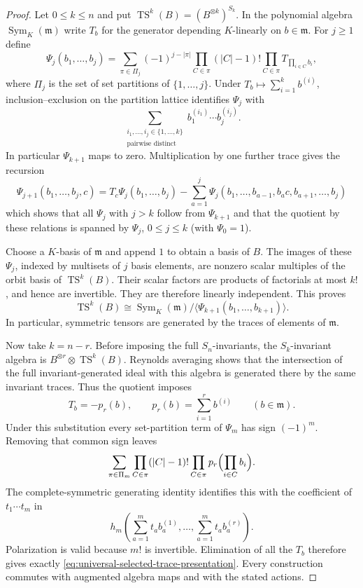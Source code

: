 \begin{proof}
Let $0\le k\le n$ and put $\operatorname{TS}^k(B)
=(B^{\otimes k})^{S_k}$.  In the polynomial algebra
$\operatorname{Sym}_K(\mathfrak m)$ write $T_b$ for the generator
depending $K$-linearly on $b\in\mathfrak m$.  For $j\ge1$ define
\[
 \Psi_j(b_1,\ldots,b_j)=
 \sum_{\pi\in\Pi_j}(-1)^{j-|\pi|}
       \prod_{C\in\pi}(|C|-1)!
       \prod_{C\in\pi}T_{\prod_{i\in C}b_i},
\]
where $\Pi_j$ is the set of set partitions of $\{1,\ldots,j\}$.
Under $T_b\mapsto\sum_{i=1}^k b^{(i)}$, inclusion--exclusion on
the partition lattice identifies $\Psi_j$ with
\[
 \sum_{\substack{i_1,\ldots,i_j\in\{1,\ldots,k\}\\
                  \text{pairwise distinct}}}
      b_1^{(i_1)}\cdots b_j^{(i_j)}.
\]
In particular $\Psi_{k+1}$ maps to zero.  Multiplication by one
further trace gives the recursion
\begin{equation}\label{eq:trace-recursion-universal}
 \Psi_{j+1}(b_1,\ldots,b_j,c)
 =T_c\Psi_j(b_1,\ldots,b_j)
  -\sum_{a=1}^j
      \Psi_j(b_1,\ldots,b_{a-1},b_ac,b_{a+1},\ldots,b_j)
\end{equation}
which shows that all $\Psi_j$ with $j>k$ follow from
$\Psi_{k+1}$ and that the quotient by these relations is spanned
by $\Psi_j$, $0\le j\le k$ (with $\Psi_0=1$).

Choose a $K$-basis of $\mathfrak m$ and append $1$ to obtain a
basis of $B$.  The images of these $\Psi_j$, indexed by multisets
of $j$ basis elements, are nonzero scalar multiples of the orbit
basis of $\operatorname{TS}^k(B)$.  Their scalar factors are
products of factorials at most $k!$, and hence are invertible.
They are therefore linearly independent.  This proves
\[
 \operatorname{TS}^k(B)
 \cong\operatorname{Sym}_K(\mathfrak m)/
       \langle\Psi_{k+1}(b_1,\ldots,b_{k+1})\rangle.
\]
In particular, symmetric tensors are generated by the traces of
elements of $\mathfrak m$.

Now take $k=n-r$.  Before imposing the full $S_n$-invariants, the
$S_k$-invariant algebra is
$B^{\otimes r}\otimes\operatorname{TS}^k(B)$.
Reynolds averaging shows that the intersection of the full
invariant-generated ideal with this algebra is generated there by
the same invariant traces.  Thus the quotient imposes
\[
 T_b=-p_r(b),\qquad
 p_r(b)=\sum_{i=1}^r b^{(i)}\qquad(b\in\mathfrak m).
\]
Under this substitution every set-partition term of $\Psi_m$ has
sign $(-1)^m$.  Removing that common sign leaves
\[
 \sum_{\pi\in\Pi_m}
       \prod_{C\in\pi}(|C|-1)!
       \prod_{C\in\pi}p_r\Bigl(\prod_{i\in C}b_i\Bigr).
\]
The complete-symmetric generating identity identifies this with
the coefficient of $t_1\cdots t_m$ in
\[
 h_m\left(\sum_{a=1}^m t_ab_a^{(1)},\ldots,
           \sum_{a=1}^m t_ab_a^{(r)}\right).
\]
Polarization is valid because $m!$ is invertible.  Elimination of
all the $T_b$ therefore gives exactly
\eqref{eq:universal-selected-trace-presentation}.  Every construction
commutes with augmented algebra maps and with the stated actions.
\end{proof}

